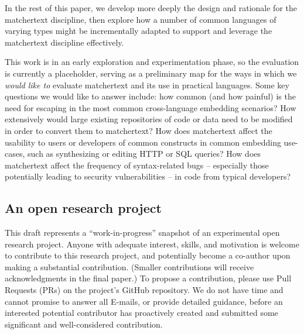 In the rest of this paper, 
we develop more deeply the design and rationale for the matchertext discipline,
then explore how a number of common languages of varying types
might be incrementally adapted to support and leverage
the matchertext discipline effectively.

This work is in an early exploration and experimentation phase,
so the evaluation is currently a placeholder,
serving as a preliminary map for the ways in which
we \emph{would like to} evaluate matchertext
and its use in practical languages.
Some key questions we would like to answer include:
how common (and how painful) is the need for escaping
in the most common cross-language embedding scenarios?
How extensively would large existing repositories of code or data
need to be modified in order to convert them to matchertext?
How does matchertext affect the usability to users or developers
of common constructs in common embedding use-cases,
such as synthesizing or editing HTTP or SQL queries?
How does matchertext affect the frequency of syntax-related bugs --
especially those potentially leading to security vulnerabilities --
in code from typical developers?





\subsection*{An open research project}

This draft represents a ``work-in-progress'' snapshot
of an experimental open research project.
Anyone with adequate interest, skills, and motivation
is welcome to contribute to this research project,
and potentially become a co-author upon making a substantial contribution.
(Smaller contributions will receive acknowledgments in the final paper.)
To propose a contribution, please use Pull Requests (PRs)
on the project's GitHub repository.
We do not have time and cannot promise to answer all E-mails,
or provide detailed guidance,
before an interested potential contributor has proactively
created and submitted some significant and well-considered contribution.

